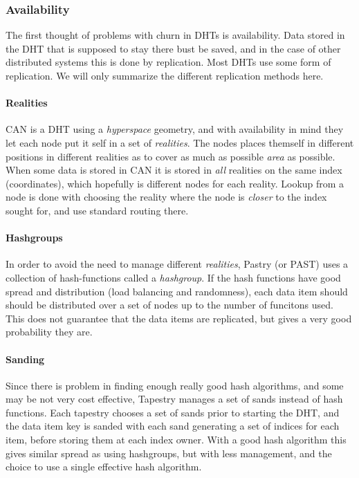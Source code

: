 \subsubsection{Availability}

The first thought of problems with churn in DHTs is availability. Data stored in the DHT
 that is supposed to stay there bust be saved, and in the case of other distributed systems
 this is done by replication. Most DHTs use some form of replication. We
 will only summarize the different replication methods here.

\paragraph{Realities}
CAN is a DHT using a \emph{hyperspace} geometry, and with availability in mind
 they let each node put it self in a set of \emph{realities}\cite{ratnasamy-01-CAN}.
 The nodes places
 themself in different positions in different realities as to cover as much as
 possible \emph{area} as possible. When some data is stored in CAN it is stored
 in \emph{all} realities on the same index (coordinates), which hopefully is
 different nodes for each reality. Lookup from a node is done with choosing the
 reality where the node is \emph{closer} to the index sought for, and use
 standard routing there.

\paragraph{Hashgroups}
In order to avoid the need to manage different \emph{realities}, Pastry (or PAST) uses
 a collection of hash-functions called a \emph{hashgroup}\cite{rowston-01-storage-past}.
 If the hash functions have good spread and distribution (load balancing and randomness),
 each data item should should be distributed over a set of nodes up to the number of
 funcitons used. This does not guarantee that the data items are replicated, but gives a very good probability they are.

\paragraph{Sanding}
Since there is problem in finding enough really good hash algorithms, and some may be
 not very cost effective, Tapestry manages a set of sands instead of
 hash functions\cite{zhao-01-tapestry}. Each tapestry chooses a set of sands prior
 to starting the DHT, and the data item key is sanded with each sand generating a
 set of indices for each item, before storing them at each index owner. With a good
 hash algorithm this gives similar spread as using hashgroups, but
 with less management, and the choice to use a single effective hash algorithm.


